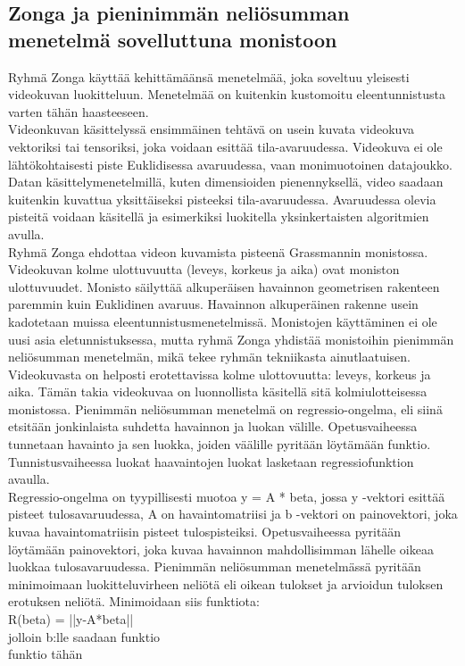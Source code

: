 \subsection{Zonga ja pieninimmän neliösumman menetelmä sovelluttuna monistoon}
Ryhmä Zonga käyttää kehittämäänsä menetelmää, joka soveltuu yleisesti videokuvan luokitteluun. 
Menetelmää on kuitenkin kustomoitu eleentunnistusta varten tähän haasteeseen.\\

Videonkuvan käsittelyssä ensimmäinen tehtävä on usein kuvata videokuva vektoriksi tai tensoriksi, joka voidaan esittää tila-avaruudessa. 
Videokuva ei ole lähtökohtaisesti piste Euklidisessa avaruudessa, vaan monimuotoinen datajoukko. Datan käsittelymenetelmillä, kuten dimensioiden pienennyksellä, video saadaan kuitenkin kuvattua yksittäiseksi pisteeksi tila-avaruudessa. Avaruudessa olevia pisteitä voidaan käsitellä
ja esimerkiksi luokitella yksinkertaisten algoritmien avulla.\\

Ryhmä Zonga ehdottaa videon kuvamista pisteenä Grassmannin monistossa. Videokuvan kolme ulottuvuutta (leveys, korkeus ja aika) ovat moniston ulottuvuudet. 
Monisto säilyttää alkuperäisen havainnon geometrisen rakenteen paremmin kuin Euklidinen avaruus.
Havainnon alkuperäinen rakenne usein kadotetaan muissa eleentunnistusmenetelmissä. Monistojen käyttäminen ei ole uusi asia eletunnistuksessa, mutta
ryhmä Zonga yhdistää monistoihin pienimmän neliösumman menetelmän, mikä tekee ryhmän tekniikasta ainutlaatuisen. \\

Videokuvasta on helposti erotettavissa kolme ulottovuutta: leveys, korkeus ja aika. Tämän takia videokuvaa on luonnollista käsitellä sitä kolmiulotteisessa monistossa.
Pienimmän neliösumman menetelmä on regressio-ongelma, eli siinä etsitään jonkinlaista suhdetta havainnon ja luokan välille. Opetusvaiheessa tunnetaan havainto ja sen luokka, joiden väälille pyritään löytämään
funktio. Tunnistusvaiheessa luokat haavaintojen luokat lasketaan regressiofunktion avaulla.\\

Regressio-ongelma on tyypillisesti muotoa y = A * beta, jossa y -vektori esittää pisteet tulosavaruudessa, A on havaintomatriisi 
ja b -vektori on painovektori, joka kuvaa havaintomatriisin pisteet tulospisteiksi.
Opetusvaiheessa pyritään löytämään painovektori, joka kuvaa havainnon mahdollisimman lähelle oikeaa luokkaa
tulosavaruudessa. Pienimmän neliösumman menetelmässä pyritään minimoimaan luokitteluvirheen neliötä eli oikean tulokset ja arvioidun tuloksen erotuksen neliötä.
Minimoidaan siis funktiota: \\
R(beta) = ||y-A*beta|| \\
jolloin b:lle saadaan funktio\\
funktio tähän\\

